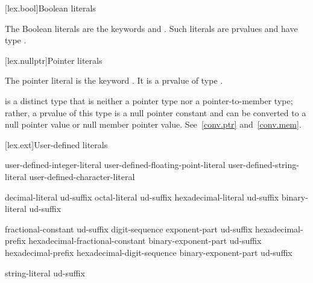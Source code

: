 [lex.bool]{Boolean literals}

%
\begin{bnf}
\br
    \br
\end{bnf}

\pnum
{}%
The Boolean literals are the keywords  and .
Such literals are prvalues and have type .

[lex.nullptr]{Pointer literals}

%
\begin{bnf}
\br
\end{bnf}

\pnum
The pointer literal is the keyword . It is a prvalue of type
.
\begin{note}
 is a distinct type that is neither a pointer type nor a pointer-to-member type;
rather, a prvalue of this type is a null pointer constant and can be
converted to a null pointer value or null member pointer value. See~\ref{conv.ptr}
and~\ref{conv.mem}.
\end{note}

[lex.ext]{User-defined literals}

%
\begin{bnf}
\br
    user-defined-integer-literal\br
    user-defined-floating-point-literal\br
    user-defined-string-literal\br
    user-defined-character-literal
\end{bnf}

\begin{bnf}
\br
    decimal-literal ud-suffix\br
    octal-literal ud-suffix\br
    hexadecimal-literal ud-suffix\br
    binary-literal ud-suffix
\end{bnf}

\begin{bnf}
\br
    fractional-constant  ud-suffix\br
    digit-sequence exponent-part ud-suffix\br
    hexadecimal-prefix hexadecimal-fractional-constant binary-exponent-part ud-suffix\br
    hexadecimal-prefix hexadecimal-digit-sequence binary-exponent-part ud-suffix
\end{bnf}

\begin{bnf}
\br
    string-literal ud-suffix
\end{bnf}

